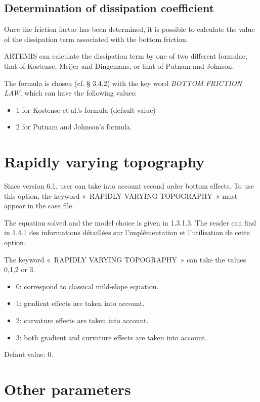\subsection{Determination of dissipation coefficient}

Once the friction factor has been determined, it is possible to calculate the
value of the dissipation term associated with the bottom friction.

ARTEMIS can calculate the dissipation term by one of two different formulae,
that of Kostense, Meijer and Dingemans, or that of Putnam and Johnson.

The formula is chosen (cf. {\S} 3.4.2) with the key word \textit{BOTTOM
FRICTION LAW}, which can have the following values:

\begin{itemize}
\item  1 for Kostense et al.'s formula (default value)

\item  2 for Putnam and Johnson's formula.
\end{itemize}


\section{Rapidly varying topography}\label{ref:curv}

Since version 6.1, user can take into account second order bottom effects. To
use this option, the keyword «~RAPIDLY VARYING TOPOGRAPHY~» must appear in the
case file.

The equation solved and the model choice is given in 1.3.1.3. The reader can
find in 1.4.1 des informations d\'{e}taill\'{e}es sur l'impl\'{e}mentation et
l'utilisation de cette option.

The keyword «~RAPIDLY VARYING TOPOGRAPHY~» can take the values 0,1,2 or 3.
\begin{itemize}
  \item 0: correspond to classical mild-slope equation.
  \item 1: gradient effects are taken into account.
  \item 2: curvature effects are taken into account.
  \item 3: both gradient
and curvature effects are taken into account.
\end{itemize}

Defaut value: 0.

\section{Other parameters}

